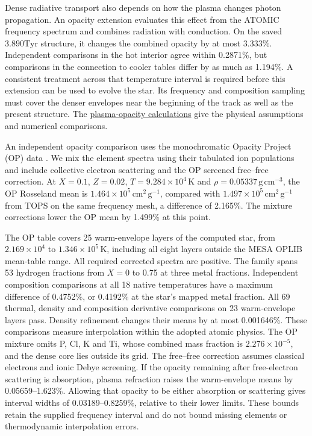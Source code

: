 \documentclass[11pt,letterpaper]{article}
\newcommand{\Tyr}{\mathrm{Tyr}}
\newcommand{\doc}[2]{\href{https://github.com/oklo/ember/blob/codex/atmosphere5000-density-checks/#1}{#2}}
\begin{document}
Dense radiative transport also depends on how the plasma changes photon
propagation. An opacity extension evaluates this effect from the ATOMIC
frequency spectrum and combines radiation with conduction. On the saved
$3.890\Tyr$ structure, it changes the combined opacity by at most 3.333\%.
Independent comparisons in the hot interior agree within 0.2871\%, but
comparisons in the connection to cooler tables differ by as much as 1.194\%.
A consistent treatment across that temperature interval is required before
this extension can be used to evolve the star. Its frequency and composition
sampling must cover the denser envelopes near the beginning of the track as
well as the present structure. The
\doc{docs/PLASMA_OPACITY.md}{plasma-opacity calculations} give the physical
assumptions and numerical comparisons.

An independent opacity comparison uses the monochromatic Opacity Project
(OP) data \cite{seaton05}. We mix the element spectra using their tabulated
ion populations and include collective electron scattering \cite{boercker87}
and the OP screened free--free correction. At $X=0.1$, $Z=0.02$,
$T=9.284\times10^4\,\mathrm{K}$ and
$\rho=0.05337\,\mathrm{g\,cm^{-3}}$, the OP Rosseland mean is
$1.464\times10^5\,\mathrm{cm^2\,g^{-1}}$, compared with
$1.497\times10^5\,\mathrm{cm^2\,g^{-1}}$ from TOPS on the same frequency
mesh, a difference of 2.165\%. The mixture corrections lower the OP mean
by 1.499\% at this point.

The OP table covers 25 warm-envelope layers of the computed star,
from $2.169\times10^4$ to $1.346\times10^5\,\mathrm{K}$, including all
eight layers outside the MESA OPLIB mean-table range. All required corrected
spectra are positive. The family spans 53 hydrogen fractions from $X=0$ to
0.75 at three metal fractions. Independent composition comparisons at all
18 native temperatures have a maximum difference of 0.4752\%, or 0.4192\%
at the star's mapped metal fraction. All 69 thermal, density and composition
derivative comparisons on 23 warm-envelope layers pass. Density refinement
changes their means by at most 0.001646\%.
These comparisons measure interpolation within the adopted atomic physics.
The OP mixture omits P, Cl, K and Ti, whose combined mass fraction is
$2.276\times10^{-5}$, and the dense core lies outside its grid.
The free--free correction assumes classical electrons and ionic Debye
screening. If the opacity remaining after free-electron scattering is
absorption, plasma refraction raises the warm-envelope means by
0.05659--1.623\%. Allowing that opacity to be either absorption or scattering
gives interval widths of 0.03189--0.8259\%, relative to their lower limits.
These bounds retain the supplied frequency interval and do not bound missing
elements or thermodynamic interpolation errors.
\end{document}
